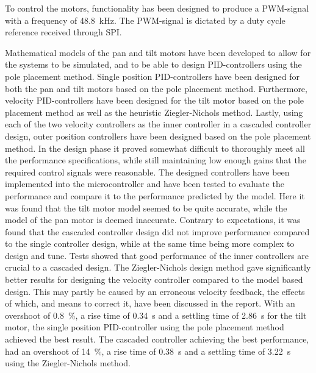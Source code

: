 \documentclass[../../main.tex]{subfiles}
\begin{document}
To control the motors, functionality has been designed to produce a PWM-signal with a frequency of \SI{48.8}{\kilo\hertz}. The PWM-signal is dictated by a duty cycle reference received through SPI.

Mathematical models of the pan and tilt motors have been developed to allow for the systems to be simulated, and to be able to design PID-controllers using the pole placement method.
Single position PID-controllers have been designed for both the pan and tilt motors based on the pole placement method. Furthermore, velocity PID-controllers have been designed for the tilt motor based on the pole placement method as well as the heuristic Ziegler-Nichols method. Lastly, using each of the two velocity controllers as the inner controller in a cascaded controller design, outer position controllers have been designed based on the pole placement method. In the design phase it proved somewhat difficult to thoroughly meet all the performance specifications, while still maintaining low enough gains that the required control signals were reasonable.
The designed controllers have been implemented into the microcontroller and have been tested to evaluate the performance and compare it to the performance predicted by the model.
Here it was found that the tilt motor model seemed to be quite accurate, while the model of the pan motor is deemed inaccurate.
Contrary to expectations, it was found that the cascaded controller design did not improve performance compared to the single controller design, while at the same time being more complex to design and tune.
Tests showed that good performance of the inner controllers are crucial to a cascaded design. The Ziegler-Nichols design method gave significantly better results for designing the velocity controller compared to the model based design. This may partly be caused by an erroneous velocity feedback, the effects of which, and means to correct it, have been discussed in the report.
With an overshoot of \SI{0,8}{\percent}, a rise time of \SI{0,34}{\second} and a settling time of \SI{2,86}{\second} for the tilt motor, the single position PID-controller using the pole placement method achieved the best result.
The cascaded controller achieving the best performance, had an overshoot of \SI{14}{\percent}, a rise time of \SI{0,38}{\second} and a settling time of \SI{3,22}{\second} using the Ziegler-Nichols method. 
\end{document}
